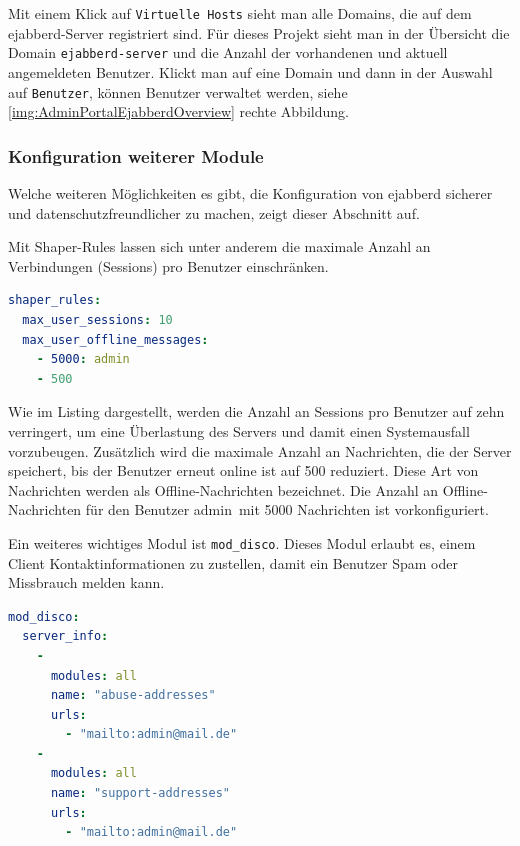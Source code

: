 \documentclass[a4paper,titlepage,halfparskip,12pt]{scrreprt}
\begin{document}
\begin{onehalfspacing}
Mit einem Klick auf \texttt{Virtuelle Hosts} sieht man alle Domains, die auf dem ejabberd-Server registriert sind. Für dieses Projekt sieht man in der Übersicht die Domain \texttt{ejabberd-server} und die Anzahl der vorhandenen und aktuell angemeldeten Benutzer. Klickt man auf eine Domain und dann in der Auswahl auf \texttt{Benutzer}, können Benutzer verwaltet werden, siehe \autoref{img:AdminPortalEjabberdOverview} rechte Abbildung.

\subsubsection*{Konfiguration weiterer Module}

Welche weiteren Möglichkeiten es gibt, die Konfiguration von ejabberd sicherer und datenschutzfreundlicher zu machen, zeigt dieser Abschnitt auf.

Mit Shaper-Rules lassen sich unter anderem die maximale Anzahl an Verbindungen (Sessions) pro Benutzer einschränken.  

\bigskip

\begin{lstlisting}[language=yaml, caption={Anpassung der Shaper-Rules}]
shaper_rules:
  max_user_sessions: 10
  max_user_offline_messages:
    - 5000: admin
    - 500
\end{lstlisting}

Wie im Listing dargestellt, werden die Anzahl an Sessions pro Benutzer auf zehn verringert, um eine Überlastung des Servers und damit einen Systemausfall vorzubeugen. Zusätzlich wird die maximale Anzahl an Nachrichten, die der Server speichert, bis der Benutzer erneut online ist auf 500 reduziert. Diese Art von Nachrichten werden als Offline-Nachrichten bezeichnet. Die Anzahl an Offline-Nachrichten für den Benutzer \glqq admin\grqq\ mit 5000 Nachrichten ist vorkonfiguriert.

Ein weiteres wichtiges Modul ist \texttt{mod\_disco}. Dieses Modul erlaubt es, einem Client Kontaktinformationen zu zustellen, damit ein Benutzer Spam oder Missbrauch melden kann.

\bigskip

\begin{lstlisting}[language=yaml, caption={Kontaktinformationen für Spam- oder Missbrauchsmeldungen}]
mod_disco:
  server_info:
    -
      modules: all
      name: "abuse-addresses"
      urls:
        - "mailto:admin@mail.de"
    -
      modules: all
      name: "support-addresses"
      urls:
        - "mailto:admin@mail.de"
\end{lstlisting}


\end{onehalfspacing}
\end{document}
